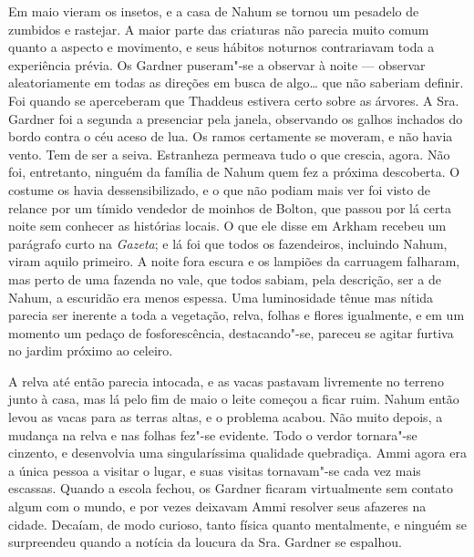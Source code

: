 Em maio vieram os insetos, e a casa de Nahum se tornou um pesadelo de
zumbidos e rastejar. A maior parte das criaturas não parecia muito comum
quanto a aspecto e movimento, e seus hábitos noturnos contrariavam toda
a experiência prévia. Os Gardner puseram"-se a observar à noite ---
observar aleatoriamente em todas as direções em busca de algo\ldots{} que
não saberiam definir. Foi quando se aperceberam que Thaddeus estivera
certo sobre as árvores. A Sra. Gardner foi a segunda a presenciar pela
janela, observando os galhos inchados do bordo contra o céu aceso de
lua. Os ramos certamente se moveram, e não havia vento. Tem de ser a
seiva. Estranheza permeava tudo o que crescia, agora. Não foi,
entretanto, ninguém da família de Nahum quem fez a próxima descoberta. O
costume os havia dessensibilizado, e o que não podiam mais ver foi visto
de relance por um tímido vendedor de moinhos de Bolton, que passou por
lá certa noite sem conhecer as histórias locais. O que ele disse em
Arkham recebeu um parágrafo curto na \emph{Gazeta}; e lá foi que todos
os fazendeiros, incluindo Nahum, viram aquilo primeiro. A noite fora
escura e os lampiões da carruagem falharam, mas perto de uma fazenda no
vale, que todos sabiam, pela descrição, ser a de Nahum, a escuridão era
menos espessa. Uma luminosidade tênue mas nítida parecia ser inerente a
toda a vegetação, relva, folhas e flores igualmente, e em um momento um
pedaço de fosforescência, destacando"-se, pareceu se agitar furtiva no
jardim próximo ao celeiro.

A relva até então parecia intocada, e as vacas pastavam livremente no
terreno junto à casa, mas lá pelo fim de maio o leite começou a ficar
ruim. Nahum então levou as vacas para as terras altas, e o problema
acabou. Não muito depois, a mudança na relva e nas folhas fez"-se
evidente. Todo o verdor tornara"-se cinzento, e desenvolvia uma
singularíssima qualidade quebradiça. Ammi agora era a única pessoa a
visitar o lugar, e suas visitas tornavam"-se cada vez mais escassas.
Quando a escola fechou, os Gardner ficaram virtualmente sem contato
algum com o mundo, e por vezes deixavam Ammi resolver seus afazeres na
cidade. Decaíam, de modo curioso, tanto física quanto mentalmente, e
ninguém se surpreendeu quando a notícia da loucura da Sra. Gardner se
espalhou.

